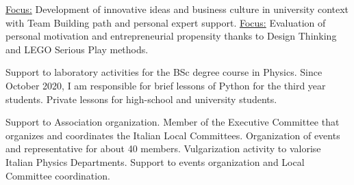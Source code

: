 \documentclass[
  a4paper, 
]{fortysecondscv}
\begin{document}
\vskip 2.5mm

\begin{cvtable}[2]
		{\underline{Focus:} Development of innovative ideas and business culture in university context   with Team Building path and personal expert support.}
		{\underline{Focus:} Evaluation of personal motivation and entrepreneurial propensity thanks to Design Thinking and LEGO Serious Play\textsuperscript{\textregistered} methods.}
\end{cvtable}

\vskip 5mm

\begin{cvtable}[2]
	    {Support to laboratory activities for the BSc degree course in Physics. Since October 2020, I am responsible for brief lessons of Python for the third year students.}
	    {Private lessons for high-school and university students.}
\end{cvtable}

\newpage
\makebacksidebar

\begin{cvtable}[2]
	    {Support to Association organization.}
	    {Member of the Executive Committee that organizes and coordinates the Italian Local Committees.}
	    {Organization of events and representative for about 40 members.}
	    {Vulgarization activity to valorise Italian Physics Departments.}
	    {Support to events organization and Local Committee coordination.}
\end{cvtable}

\end{document}
